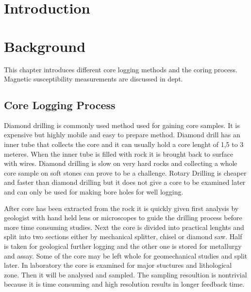 \documentclass[12pt,a4paper,oneside,pdftex]{report}
\begin{document}

% 

\chapter{Introduction}
\label{chapter:intro}






% 

\chapter{Background}
\label{chapter:background}

This chapter introduces different core logging methods and the coring process. 
Magnetic susceptibility measurements are discussed in dept.

\section{Core Logging Process}

Diamond drilling is commonly used method used for gaining core samples. It is expensive but highly
mobile and easy to prepare method. Diamond drill has an inner tube that collects the core and it can 
usually  hold a core lenght of 1,5 to 3 meteres. When the inner tube is filled with rock it is brought
back to surface with wires. Diamond drilling is slow on very hard rocks and collecting a whole core
sample on soft stones can prove to be a challenge. Rotary Drilling is cheaper and faster than diamond
drilling but it does not give a core to be examined later and can only be used for making bore holes
for well logging.\cite{Peters1987}


After core has been extracted from the rock it is quickly given first analysis by geologist with 
hand held lens or microscopes to guide the drilling process before more time consuming studies. 
Next the core is divided into practical lenghts and split into two
sections either by mechanical splitter, chisel or diamond saw. Half is taken for geological further
logging and the other one is stored for metallurgy and assay. Some of the core may be left whole
for geomechanical studies and split later. In laboratory the core is examined for major 
stuctures and lithological zone. Then it will be analysed and sampled. The sampling resoultion 
is nontrivial because it is time consuming and high resolution results in longer feedback time.\cite{Peters1987}
\end{document}
